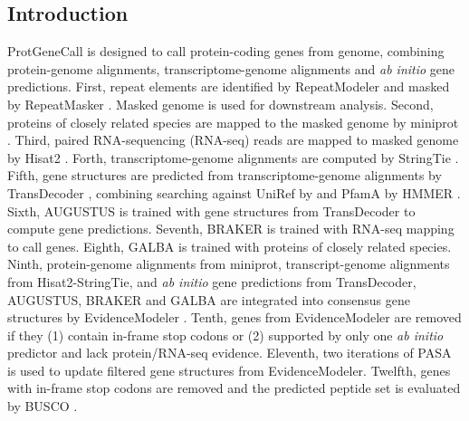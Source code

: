 \documentclass[11pt]{article}
\begin{document}
\begin{sloppypar}
\subsection{Introduction}
ProtGeneCall is designed to call protein-coding genes from genome, combining protein-genome alignments, transcriptome-genome alignments and \textit{ab initio} gene predictions. 
First, repeat elements are identified by RepeatModeler \parencite{smit2015repeatmodeler} and masked by RepeatMasker \parencite{smit2015repeatmasker}. 
Masked genome is used for downstream analysis. 
Second, proteins of closely related species are mapped to the masked genome by miniprot \parencite{li2023protein}. 
Third, paired RNA-sequencing (RNA-seq) reads are mapped to masked genome by Hisat2 \parencite{kim2019graph}. 
Forth, transcriptome-genome alignments are computed by StringTie \parencite{pertea2015stringtie}. 
Fifth, gene structures are predicted from transcriptome-genome alignments by TransDecoder \parencite{haas2016transdecoder}, combining searching against UniRef \parencite{suzek2007uniref} by \parencite{buchfink2015fast} and PfamA \parencite{mistry2021pfam} by HMMER \parencite{eddy1992hmmer}. 
Sixth, AUGUSTUS \parencite{stanke2003gene} is trained with gene structures from TransDecoder to compute gene predictions. 
Seventh, BRAKER \parencite{hoff2019whole} is trained with RNA-seq mapping to call genes. 
Eighth, GALBA \parencite{hoff2019whole} is trained with proteins of closely related species. 
Ninth, protein-genome alignments from miniprot, transcript-genome alignments from Hisat2-StringTie, and \textit{ab initio} gene predictions from TransDecoder, AUGUSTUS, BRAKER and GALBA are integrated into consensus gene structures by EvidenceModeler \parencite{haas2008automated}. 
Tenth, genes from EvidenceModeler are removed if they (1) contain in-frame stop codons or (2) supported by only one \textit{ab initio} predictor and lack protein/RNA-seq evidence. 
Eleventh, two iterations of PASA \parencite{haas2008automated} is used to update filtered gene structures from EvidenceModeler. 
Twelfth, genes with in-frame stop codons are removed and the predicted peptide set is evaluated by BUSCO \parencite{simao2015busco}.

\end{sloppypar}
\end{document}
